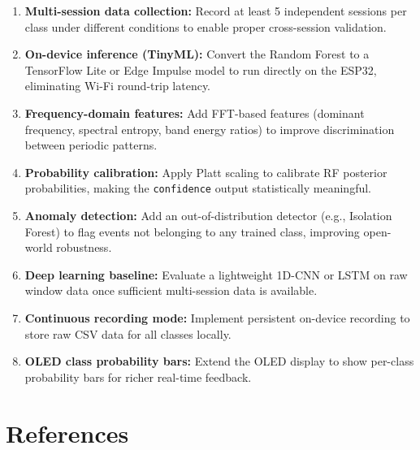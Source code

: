 \documentclass[12pt,a4paper]{report}
\begin{document}
\begin{enumerate}
  \item \textbf{Multi-session data collection:} Record at least 5 independent
        sessions per class under different conditions to enable proper
        cross-session validation.
  \item \textbf{On-device inference (TinyML):} Convert the Random Forest to
        a TensorFlow Lite or Edge Impulse model to run directly on the ESP32,
        eliminating Wi-Fi round-trip latency.
  \item \textbf{Frequency-domain features:} Add FFT-based features (dominant
        frequency, spectral entropy, band energy ratios) to improve
        discrimination between periodic patterns.
  \item \textbf{Probability calibration:} Apply Platt scaling to calibrate
        RF posterior probabilities, making the \texttt{confidence} output
        statistically meaningful.
  \item \textbf{Anomaly detection:} Add an out-of-distribution detector
        (e.g., Isolation Forest) to flag events not belonging to any trained
        class, improving open-world robustness.
  \item \textbf{Deep learning baseline:} Evaluate a lightweight 1D-CNN or
        LSTM on raw window data once sufficient multi-session data is
        available.
  \item \textbf{Continuous recording mode:} Implement persistent on-device
        recording to store raw CSV data for all classes locally.
  \item \textbf{OLED class probability bars:} Extend the OLED display to
        show per-class probability bars for richer real-time feedback.
\end{enumerate}

\chapter{References}
\end{document}
